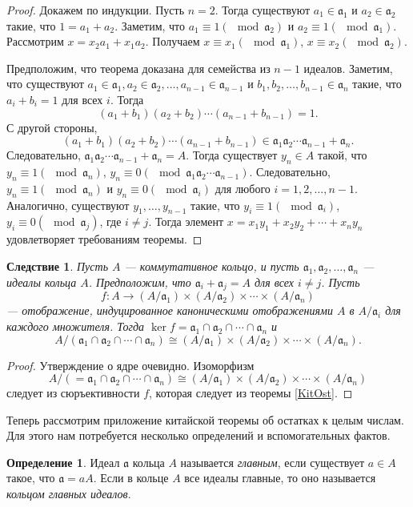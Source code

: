 \documentclass[12pt, titlepage, oneside]{amsbook}
\newcommand{\aaa}{\mathfrak{a}}
\newtheorem{corollary}[theorem]{Следствие}
\theoremstyle{definition}
\newtheorem{definition}[theorem]{Определение}
\theoremstyle{remark}
\begin{document}
\begin{proof}
	Докажем по индукции. Пусть $n=2$. Тогда существуют $a_1\in\aaa_1$ и $a_2\in\aaa_2$ такие, что $1=a_1+a_2$. Заметим, что $a_1\equiv 1 (\mod\aaa_2)$ и $a_2\equiv 1 (\mod\aaa_1)$. Рассмотрим $x=x_2a_1+x_1a_2$. Получаем $x\equiv x_1 (\mod\aaa_1)$, $x\equiv x_2 (\mod\aaa_2)$.
	
	Предположим, что теорема доказана для семейства из $n-1$ идеалов. Заметим, что существуют $a_1\in\aaa_1, a_2\in\aaa_2,\ldots,a_{n-1}\in\aaa_{n-1}$ и $b_1,b_2,\ldots,b_{n-1}\in\aaa_n$ такие, что $a_i+b_i=1$ для всех $i$. Тогда $$(a_1+b_1)(a_2+b_2)\cdots(a_{n-1}+b_{n-1})=1.$$ С другой стороны, $$(a_1+b_1)(a_2+b_2)\cdots(a_{n-1}+b_{n-1})\in \aaa_1\aaa_2\cdots\aaa_{n-1}+\aaa_n.$$ Следовательно, $\aaa_1\aaa_2\cdots\aaa_{n-1}+\aaa_n=A$. Тогда существует $y_n\in A$ такой, что $y_n\equiv 1 (\mod\aaa_n)$, $y_n\equiv 0 (\mod\aaa_1\aaa_2\cdots\aaa_{n-1})$. Следовательно, $y_n\equiv 1 (\mod\aaa_n)$ и $y_n\equiv 0 (\mod\aaa_i)$ для любого $i=1,2,\ldots,n-1$. Аналогично, существуют $y_1,\ldots, y_{n-1}$ такие, что $y_i\equiv 1(\mod\aaa_i)$, $y_i\equiv 0(\mod\aaa_j)$, где $i\neq j$. Тогда элемент $x=x_1y_1+x_2y_2+\cdots+x_ny_n$ удовлетворяет требованиям теоремы.
\end{proof}

\begin{corollary}
	\label{KitOst2} Пусть $A$ --- коммутативное кольцо, и пусть $\aaa_1,\aaa_2,\ldots,\aaa_n$ --- идеалы кольца $A$. Предположим, что $\aaa_i+\aaa_j=A$ для всех $i\neq j$. Пусть $$f\colon A\rightarrow (A/\aaa_1)\times(A/\aaa_2)\times\cdots\times(A/\aaa_n)$$ --- отображение, индуцированное каноническими отображениями $A$ в $A/\aaa_i$ для каждого множителя. Тогда $\ker f=\aaa_1\cap\aaa_2\cap\cdots\cap\aaa_n$ и $$A/(\aaa_1\cap\aaa_2\cap\cdots\cap\aaa_n)\cong(A/\aaa_1)\times(A/\aaa_2)\times\cdots\times(A/\aaa_n).$$
\end{corollary}

\begin{proof}
	Утверждение о ядре очевидно. Изоморфизм $$A/(=\aaa_1\cap\aaa_2\cap\cdots\cap\aaa_n)\cong(A/\aaa_1)\times(A/\aaa_2)\times\cdots\times(A/\aaa_n)$$ следует из сюръективности $f$, которая следует из теоремы \ref{KitOst}.
\end{proof}

Теперь рассмотрим приложение китайской теоремы об остатках к целым числам. Для этого нам потребуется несколько определений и вспомогательных фактов.

\begin{definition}
	Идеал $\aaa$ кольца $A$ называется \emph{главным}, если существует $a\in A$ такое, что $\aaa=aA$. Если в кольце $A$ все идеалы главные, то оно называется \emph{кольцом главных идеалов}.
\end{definition}
\end{document}
